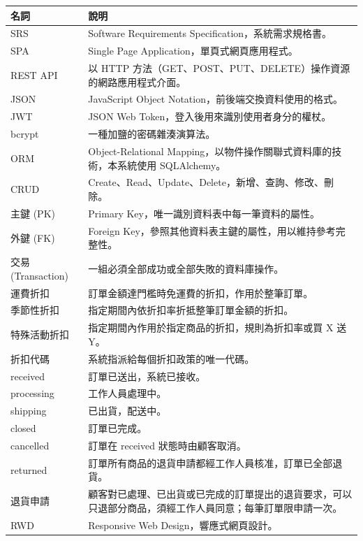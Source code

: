 \documentclass[12pt,a4paper]{article}
\begin{document}
\begin{xltabular}{\linewidth}{|>{\centering\arraybackslash}p{3.4cm}|X|}
\hline{}\textbf{名詞} & \textbf{說明}\\\hline\endhead
SRS & Software Requirements Specification，系統需求規格書。\\\hline
SPA & Single Page Application，單頁式網頁應用程式。\\\hline
REST API & 以 HTTP 方法（GET、POST、PUT、DELETE）操作資源的網路應用程式介面。\\\hline
JSON & JavaScript Object Notation，前後端交換資料使用的格式。\\\hline
JWT & JSON Web Token，登入後用來識別使用者身分的權杖。\\\hline
bcrypt & 一種加鹽的密碼雜湊演算法。\\\hline
ORM & Object-Relational Mapping，以物件操作關聯式資料庫的技術，本系統使用 SQLAlchemy。\\\hline
CRUD & Create、Read、Update、Delete，新增、查詢、修改、刪除。\\\hline
主鍵 (PK) & Primary Key，唯一識別資料表中每一筆資料的屬性。\\\hline
外鍵 (FK) & Foreign Key，參照其他資料表主鍵的屬性，用以維持參考完整性。\\\hline
交易 (Transaction) & 一組必須全部成功或全部失敗的資料庫操作。\\\hline
運費折扣 & 訂單金額達門檻時免運費的折扣，作用於整筆訂單。\\\hline
季節性折扣 & 指定期間內依折扣率折抵整筆訂單金額的折扣。\\\hline
特殊活動折扣 & 指定期間內作用於指定商品的折扣，規則為折扣率或買 X 送 Y。\\\hline
折扣代碼 & 系統指派給每個折扣政策的唯一代碼。\\\hline
received & 訂單已送出，系統已接收。\\\hline
processing & 工作人員處理中。\\\hline
shipping & 已出貨，配送中。\\\hline
closed & 訂單已完成。\\\hline
cancelled & 訂單在 received 狀態時由顧客取消。\\\hline
returned & 訂單所有商品的退貨申請都經工作人員核准，訂單已全部退貨。\\\hline
退貨申請 & 顧客對已處理、已出貨或已完成的訂單提出的退貨要求，可以只退部分商品，須經工作人員同意；每筆訂單限申請一次。\\\hline
RWD & Responsive Web Design，響應式網頁設計。\\\hline
\end{xltabular}
\end{document}
